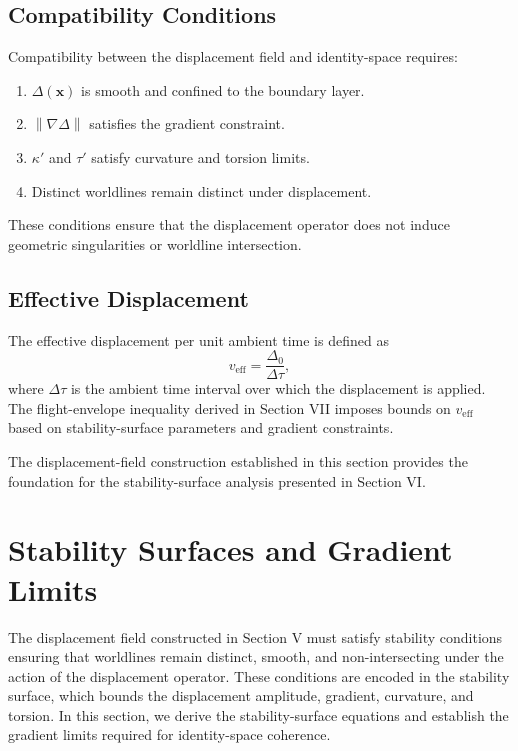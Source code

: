 \documentclass[aip,adv,reprint,floatfix]{revtex4-2}
\begin{document}
\subsection{Compatibility Conditions}

Compatibility between the displacement field and identity-space requires:
\begin{enumerate}
\item $\Delta(\mathbf{x})$ is smooth and confined to the boundary layer.
\item $\left\| \nabla \Delta \right\|$ satisfies the gradient constraint.
\item $\kappa'$ and $\tau'$ satisfy curvature and torsion limits.
\item Distinct worldlines remain distinct under displacement.
\end{enumerate}
These conditions ensure that the displacement operator does not induce geometric singularities or worldline intersection.

\subsection{Effective Displacement}

The effective displacement per unit ambient time is defined as
\begin{equation}
v_{\mathrm{eff}} = \frac{\Delta_0}{\Delta \tau},
\end{equation}
where $\Delta \tau$ is the ambient time interval over which the displacement is applied. The flight-envelope inequality derived in Section VII imposes bounds on $v_{\mathrm{eff}}$ based on stability-surface parameters and gradient constraints.

The displacement-field construction established in this section provides the foundation for the stability-surface analysis presented in Section VI.
\section{Stability Surfaces and Gradient Limits}

The displacement field constructed in Section V must satisfy stability conditions ensuring that worldlines remain distinct, smooth, and non-intersecting under the action of the displacement operator. These conditions are encoded in the stability surface, which bounds the displacement amplitude, gradient, curvature, and torsion. In this section, we derive the stability-surface equations and establish the gradient limits required for identity-space coherence.
\end{document}
